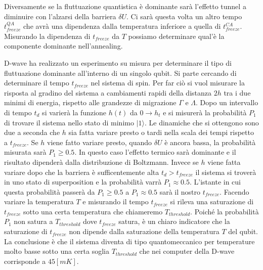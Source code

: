 Diversamente se la fluttuazione quantistica è dominante sarà l'effetto tunnel a diminuire con l'alzarsi della barriera $\delta U$. Ci sarà questa volta un altro tempo $t_{freeze}^{QA}$ che avrà una dipendenza dalla temperatura inferiore a quella di $t_{freeze}^{CA}$. Misurando la dipendenza di $t_{freeze}$ da $T$ possiamo determinare qual'è la componente dominante nell'annealing.

D-wave ha realizzato un esperimento su misura per determinare il tipo di fluttuazione dominante all'interno di un singolo qubit. Si parte cercando di determinare il tempo $t_{freeze}$ nel sistema di spin. Per far ciò si vuol misurare la risposta al gradino del sistema a cambiamenti rapidi della distanza $2h$ tra i due minimi di energia, rispetto alle grandezze di migrazione $\Gamma$ e $\Lambda$.
Dopo un intervallo di tempo $t_d$ si varierà la funzione $h(t)$ da $0 \to h_t$ e si misurerà la probabilità $P_1$ di trovare il sistema nello stato di minimo $|1\rangle$. Le dinamiche che si ottengono sono due a seconda che $h$ sia fatta variare presto o tardi nella scala dei tempi rispetto a $t_{freeze}$.
Se $h$ viene fatto variare presto, quando $\delta U$ è ancora bassa, la probabilità misurata sarà $P_1 \ge 0.5$. In questo caso l'effetto termico sarà dominante e il risultato dipenderà dalla distribuzione di Boltzmann. Invece se $h$ viene fatta variare dopo che la barriera è sufficentemente alta $t_d > t_{freeze}$ il sistema si troverà in uno stato di superposition e la probabilità varrà $P_1 \approx 0.5$. L'istante in cui questa probabilità passerà da $P_1 \ge 0.5$ a $P_1 \approx 0.5$ sarà il nostro $t_{freeze}$.
Facendo variare la temperatura $T$ e misurando il tempo $t_{freeze}$ si rileva una saturazione di $t_{freeze}$ sotto una certa temperatura che chiameremo $T_{threshold}$. Poiché la probabilità $P_1$ non satura a $T_{threshold}$ dove $t_{freeze}$ satura, è un chiaro indicatore che la saturazione di $t_{freeze}$ non dipende dalla saturazione della temperatura $T$ del qubit. La conclusione è che il sistema diventa di tipo quantomeccanico per temperature molto basse sotto una certa soglia $T_{threshold}$ che nei computer della D-wave corrisponde a $45 [mK]$.
